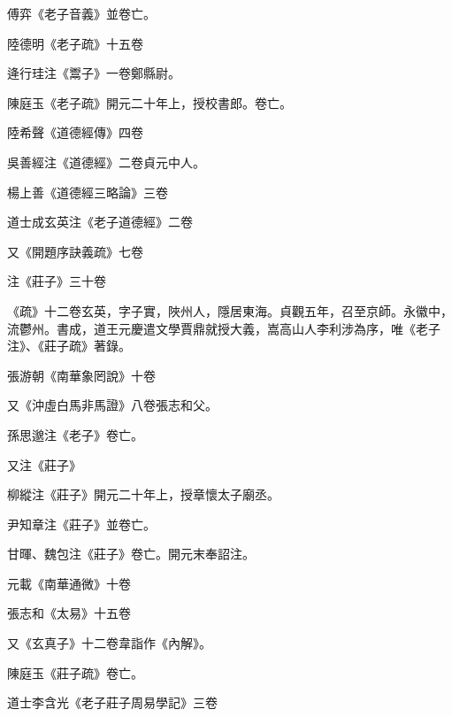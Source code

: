 \begin{pinyinscope}
 傅弈《老子音義》並卷亡。



 陸德明《老子疏》十五卷



 逄行珪注《鬻子》一卷鄭縣尉。



 陳庭玉《老子疏》開元二十年上，授校書郎。卷亡。



 陸希聲《道德經傳》四卷



 吳善經注《道德經》二卷貞元中人。



 楊上善《道德經三略論》三卷



 道士成玄英注《老子道德經》二卷



 又《開題序訣義疏》七卷



 注《莊子》三十卷



 《疏》十二卷玄英，字子實，陜州人，隱居東海。貞觀五年，召至京師。永徽中，流鬱州。書成，道王元慶遣文學賈鼎就授大義，嵩高山人李利涉為序，唯《老子注》、《莊子疏》著錄。



 張游朝《南華象罔說》十卷



 又《沖虛白馬非馬證》八卷張志和父。



 孫思邈注《老子》卷亡。



 又注《莊子》



 柳縱注《莊子》開元二十年上，授章懷太子廟丞。



 尹知章注《莊子》並卷亡。



 甘暉、魏包注《莊子》卷亡。開元末奉詔注。



 元載《南華通微》十卷



 張志和《太易》十五卷



 又《玄真子》十二卷韋詣作《內解》。



 陳庭玉《莊子疏》卷亡。



 道士李含光《老子莊子周易學記》三卷




\end{pinyinscope}

